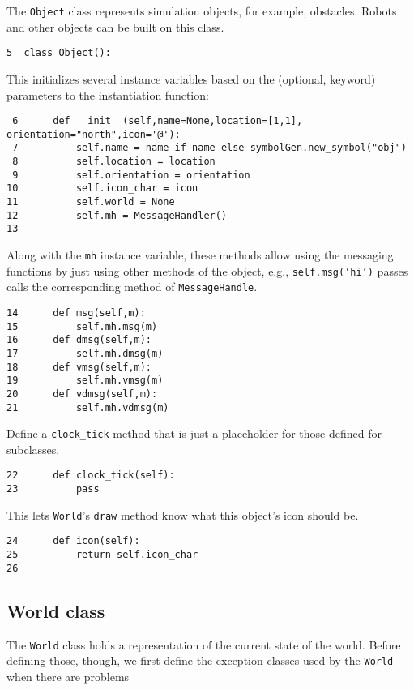 \documentclass[11pt]{tufte-handout}
\begin{document}
The \texttt{Object} class represents simulation objects, for example, obstacles.  Robots and other objects can be built on this class.


\begin{verbatim}
5  class Object():
\end{verbatim}

This initializes several instance variables based on the (optional, keyword) parameters to the instantiation function:

\begin{verbatim}
 6      def __init__(self,name=None,location=[1,1], orientation="north",icon='@'):
 7          self.name = name if name else symbolGen.new_symbol("obj")
 8          self.location = location
 9          self.orientation = orientation
10          self.icon_char = icon
11          self.world = None
12          self.mh = MessageHandler()
13  
\end{verbatim}

Along with the \texttt{mh} instance variable, these methods allow using the messaging functions by just using other methods of the object, e.g., \texttt{self.msg('hi')} passes calls the corresponding method of \texttt{MessageHandle}.

\begin{verbatim}
14      def msg(self,m):
15          self.mh.msg(m)
16      def dmsg(self,m):
17          self.mh.dmsg(m)
18      def vmsg(self,m):
19          self.mh.vmsg(m)
20      def vdmsg(self,m):
21          self.mh.vdmsg(m)
\end{verbatim}

Define a \texttt{clock\_tick} method that is just a placeholder for those defined for subclasses.

\begin{verbatim}
22      def clock_tick(self):
23          pass
\end{verbatim}

This lets \texttt{World}'s \texttt{draw} method know what this object's icon should be.

\begin{verbatim}
24      def icon(self):
25          return self.icon_char
26  
\end{verbatim}

\subsection{World class}
\label{sec:orgbe1a7e1}

The \texttt{World} class holds a representation of the current state of the world.  Before defining those, though, we first define the exception classes used by the \texttt{World} when there are problems
\end{document}
